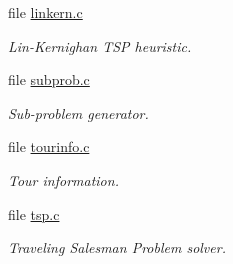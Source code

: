 \begin{CompactItemize}
\item 
file \hyperlink{linkern_8c}{linkern.c}
\begin{CompactList}\small\item\em Lin-Kernighan TSP heuristic. \item\end{CompactList}

\item 
file \hyperlink{subprob_8c}{subprob.c}
\begin{CompactList}\small\item\em Sub-problem generator. \item\end{CompactList}

\item 
file \hyperlink{tourinfo_8c}{tourinfo.c}
\begin{CompactList}\small\item\em Tour information. \item\end{CompactList}

\item 
file \hyperlink{bin_2tsp_8c}{tsp.c}
\begin{CompactList}\small\item\em Traveling Salesman Problem solver. \item\end{CompactList}

\end{CompactItemize}
